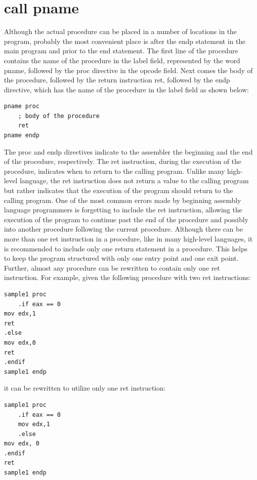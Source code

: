 \documentclass[10pt]{article}
\begin{document}
\section*{call pname}
Although the actual procedure can be placed in a number of locations in the program, probably the most convenient place is after the endp statement in the main program and prior to the end statement. The first line of the procedure contains the name of the procedure in the label field, represented by the word pname, followed by the proc directive in the opcode field. Next comes the body of the procedure, followed by the return instruction ret, followed by the endp directive, which has the name of the procedure in the label field as shown below:

\begin{verbatim}
pname proc
    ; body of the procedure
    ret
pname endp
\end{verbatim}

The proc and endp directives indicate to the assembler the beginning and the end of the procedure, respectively. The ret instruction, during the execution of the procedure, indicates when to return to the calling program. Unlike many high-level language, the ret instruction does not return a value to the calling program but rather indicates that the execution of the program should return to the calling program. One of the most common errors made by beginning assembly language programmers is forgetting to include the ret instruction, allowing the execution of the program to continue past the end of the procedure and possibly into another procedure following the current procedure. Although there can be more than one ret instruction in a procedure, like in many high-level languages, it is recommended to include only one return statement in a procedure. This helps to keep the program structured with only one entry point and one exit point. Further, almost any procedure can be rewritten to contain only one ret instruction. For example, given the following procedure with two ret instructions:

\begin{verbatim}
sample1 proc
    .if eax == 0
mov edx,1
ret
.else
mov edx,0
ret
.endif
sample1 endp
\end{verbatim}

it can be rewritten to utilize only one ret instruction:

\begin{verbatim}
sample1 proc
    .if eax == 0
    mov edx,1
    .else
mov edx, 0
.endif
ret
sample1 endp
\end{verbatim}
\end{document}
